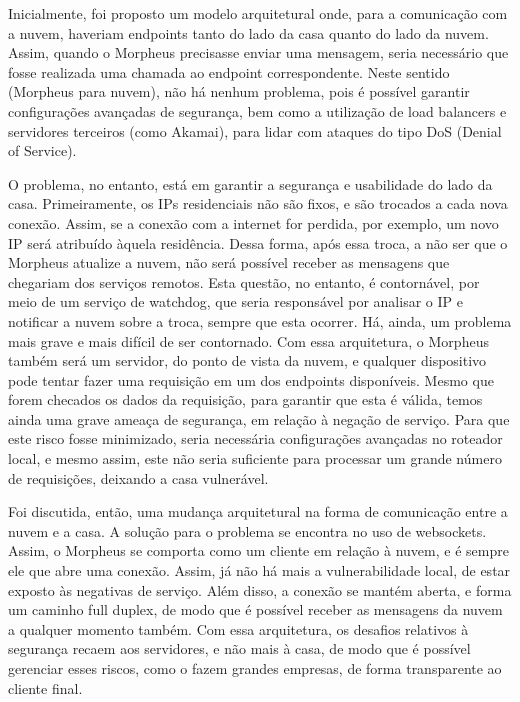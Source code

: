Inicialmente, foi proposto um modelo arquitetural onde, para a comunicação com a nuvem, haveriam endpoints tanto do lado da casa quanto do lado da nuvem. Assim, quando o Morpheus precisasse enviar uma mensagem, seria necessário que fosse realizada uma chamada ao endpoint correspondente. Neste sentido (Morpheus para nuvem), não há nenhum problema, pois é possível garantir configurações avançadas de segurança, bem como a utilização de load balancers e servidores terceiros (como Akamai), para lidar com ataques do tipo DoS (Denial of Service).

O problema, no entanto, está em garantir a segurança e usabilidade do lado da casa. Primeiramente, os IPs residenciais não são fixos, e são trocados a cada nova conexão. Assim, se a conexão com a internet for perdida, por exemplo, um novo IP será atribuído àquela residência. Dessa forma, após essa troca, a não ser que o Morpheus atualize a nuvem, não será possível receber as mensagens que chegariam dos serviços remotos. Esta questão, no entanto, é contornável, por meio de um serviço de watchdog, que seria responsável por analisar o IP e notificar a nuvem sobre a troca, sempre que esta ocorrer. Há, ainda, um problema mais grave e mais difícil de ser contornado. Com essa arquitetura, o Morpheus também será um servidor, do ponto de vista da nuvem, e qualquer dispositivo pode tentar fazer uma requisição em um dos endpoints disponíveis. Mesmo que forem checados os dados da requisição, para garantir que esta é válida, temos ainda uma grave ameaça de segurança, em relação à negação de serviço. Para que este risco fosse minimizado, seria necessária configurações avançadas no roteador local, e mesmo assim, este não seria suficiente para processar um grande número de requisições, deixando a casa vulnerável.

Foi discutida, então, uma mudança arquitetural na forma de comunicação entre a nuvem e a casa. A solução para o problema se encontra no uso de websockets. Assim, o Morpheus se comporta como um cliente em relação à nuvem, e é sempre ele que abre uma conexão. Assim, já não há mais a vulnerabilidade local, de estar exposto às negativas de serviço. Além disso, a conexão se mantém aberta, e forma um caminho full duplex, de modo que é possível receber as mensagens da nuvem a qualquer momento também. Com essa arquitetura, os desafios relativos à segurança recaem aos servidores, e não mais à casa, de modo que é possível gerenciar esses riscos, como o fazem grandes empresas, de forma transparente ao cliente final.

